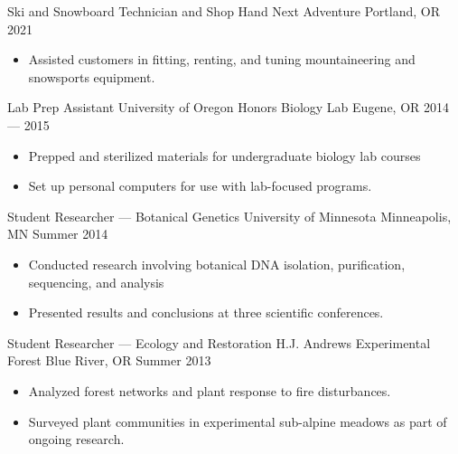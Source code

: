 \showoff
{Ski and Snowboard Technician and Shop Hand}
{Next Adventure}
{Portland, OR}
{2021}
\begin{itemize}[label=$\triangleright$]
    \item Assisted customers in fitting, renting, and tuning mountaineering and snowsports equipment.
\end{itemize}

\myBreak

\showoff
{Lab Prep Assistant}
{University of Oregon Honors Biology Lab}
{Eugene, OR}
{2014 --- 2015}
\begin{itemize}[label=$\triangleright$]
    \item Prepped and sterilized materials for undergraduate biology lab courses
    \item Set up personal computers for use with lab-focused programs.
\end{itemize}

\myBreak

\showoff
{Student Researcher --- Botanical Genetics}
{University of Minnesota}
{Minneapolis, MN}
{Summer 2014}
\begin{itemize}[label=$\triangleright$]
    \item Conducted research involving botanical DNA isolation, purification, sequencing, and analysis
    \item Presented results and conclusions at three scientific conferences.
\end{itemize}

\myBreak

\showoff
{Student Researcher --- Ecology and Restoration}
{H.J. Andrews Experimental Forest}
{Blue River, OR}
{Summer 2013}
\begin{itemize}[label=$\triangleright$]
    \item Analyzed forest networks and plant response to fire disturbances.
    \item Surveyed plant communities in experimental sub-alpine meadows as part of ongoing research.
\end{itemize}

